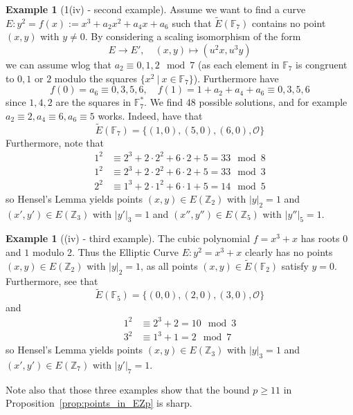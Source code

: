 \documentclass{scrartcl}
\newcommand{\Z}{\mathbb{Z}}
\newcommand{\F}{\mathbb{F}}
\renewcommand{\O}{\mathcal{O}}
\theoremstyle{definition}
\newtheorem{example}[subsection]{Example}
\begin{document}
\begin{example}[1(iv) - second example]
    Assume we want to find a curve $E: y^2 = f(x) := x^3 + a_2 x^2 + a_4 x + a_6$ such that $\tilde{E}(\F_7)$ contains no point $(x, y)$ with $y \neq 0$.
    By considering a scaling isomorphism of the form
    \begin{equation*}
        E \to E', \quad (x, y) \mapsto (u^2 x, u^3 y)
    \end{equation*}
    we can assume wlog that $a_2 \equiv 0, 1, 2 \mod 7$ (as each element in $\F_7$ is congruent to $0, 1$ or $2$ modulo the squares $\{ x^2 \ | \ x \in \F_7 \}$).
    Furthermore have
    \begin{equation*}
        f(0) = a_6 \equiv 0, 3, 5, 6, \quad f(1) = 1 + a_2 + a_4 + a_6 \equiv 0, 3, 5, 6
    \end{equation*}
    since $1, 4, 2$ are the squares in $\F_7^*$.
    We find 48 possible solutions, and for example $a_2 \equiv 2, a_4 \equiv 6, a_6 \equiv 5$ works.
    Indeed, have that
    \begin{equation*}
        \tilde{E}(\F_7) = \{ (1, 0), (5, 0), (6, 0), \O \}
    \end{equation*}
    Furthermore, note that
    \begin{align*}
        1^2 &\equiv 2^3 + 2 \cdot 2^2 + 6 \cdot 2 + 5 = 33 \mod 8 \\
        1^2 &\equiv 2^3 + 2 \cdot 2^2 + 6 \cdot 2 + 5 = 33 \mod 3 \\
        2^2 &\equiv 1^3 + 2 \cdot 1^2 + 6 \cdot 1 + 5 = 14 \mod 5
    \end{align*}
    so Hensel's Lemma yields \cite[Thm 1.15]{lecture} points $(x, y) \in E(\Z_2)$ with $|y|_2 = 1$ and $(x', y') \in E(\Z_3)$ with $|y'|_3 = 1$ and $(x'', y'') \in E(\Z_5)$ with $|y''|_5 = 1$.
\end{example}
\begin{example}[(iv) - third example]
    The cubic polynomial $f = x^3 + x$ has roots $0$ and $1$ modulo 2.
    Thus the Elliptic Curve $E: y^2 = x^3 + x$ clearly has no points $(x, y) \in E(\Z_2)$ with $|y|_2 = 1$, as all points $(x, y) \in \tilde{E}(\F_2)$ satisfy $y = 0$.
    Furthermore, see that
    \begin{equation*}
        \tilde{E}(\F_5) = \{ (0, 0), (2, 0), (3, 0), \O \}
    \end{equation*}
    and
    \begin{align*}
        1^2 &\equiv 2^3 + 2 = 10 \mod 3 \\
        3^2 &\equiv 1^3 + 1 = 2 \mod 7
    \end{align*}
    so Hensel's Lemma yields \cite[Thm 1.15]{lecture} points $(x, y) \in E(\Z_3)$ with $|y|_3 = 1$ and $(x', y') \in E(\Z_7)$ with $|y'|_7 = 1$.
\end{example}
Note also that those three examples show that the bound $p \geq 11$ in Proposition~\ref{prop:points_in_EZp} is sharp.
\end{document}
